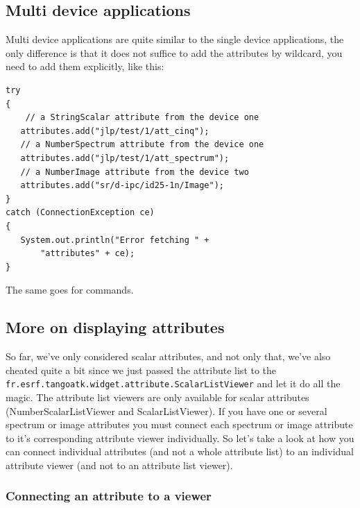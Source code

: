 \subsection{Multi device applications}

Multi device applications are quite similar to the single device applications,
the only difference is that it does not suffice to add the attributes
by wildcard, you need to add them explicitly, like this: \\



\begin{verbatim}
try
{ 
    // a StringScalar attribute from the device one
   attributes.add("jlp/test/1/att_cinq");
   // a NumberSpectrum attribute from the device one
   attributes.add("jlp/test/1/att_spectrum");
   // a NumberImage attribute from the device two
   attributes.add("sr/d-ipc/id25-1n/Image");
}
catch (ConnectionException ce)
{
   System.out.println("Error fetching " + 
       "attributes" + ce);
}

\end{verbatim}


The same goes for commands.


\subsection{More on displaying attributes}

So far, we've only considered scalar attributes, and
not only that, we've also cheated quite a bit since we just passed
the attribute list to the \texttt{fr.esrf.tangoatk.widget.attribute.ScalarListViewer}
and let it do all the magic. The attribute list viewers are only available
for scalar attributes (NumberScalarListViewer
and ScalarListViewer). If you have one or
several spectrum or image attributes
you must connect each spectrum or image attribute to it's corresponding
attribute viewer individually. So let's take a look at how you can
connect individual attributes (and not a whole attribute list) to
an individual attribute viewer (and not to an attribute list viewer).


\subsubsection{Connecting an attribute to a viewer}

